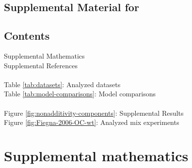 \documentclass[11pt]{article}
\begin{document}

\appendix

\clearpage
\setcounter{page}{1}
\renewcommand{\thefigure}{S\arabic{figure}}
\setcounter{figure}{0}
\renewcommand{\theequation}{S\arabic{equation}}
\setcounter{equation}{0}
\renewcommand{\thetable}{S\arabic{table}}
\setcounter{table}{0}

\subsection{Supplemental Material for}
\maketitle

\subsection{Contents}
Supplemental Mathematics \dotfill \pageref{sec:supplemental-math} \\
Supplemental References \dotfill \pageref{sec:supplemental-references} \\
\\
Table \ref{tab:datasets}: Analyzed datasets 
	\dotfill \pageref{tab:datasets} \\
Table \ref{tab:model-comparisons}: Model comparisons 
	\dotfill \pageref{tab:model-comparisons} \\
\\
Figure \ref{fig:nonadditivity-components}: Supplemental Results
	\dotfill \pageref{fig:nonadditivity-components}\\
Figure \ref{fig:Fiegna-2006-OC-wt}: Analyzed mix experiments
	\dotfill \pageref{fig:Fiegna-2006-OC-wt}\\


\clearpage
\pagestyle{fancy}
\fancyhf{}
\cfoot{\small \thepage}

% 
% 
\clearpage
\section*{Supplemental mathematics}
\label{sec:supplemental-math}


% 
% 
\end{document}
